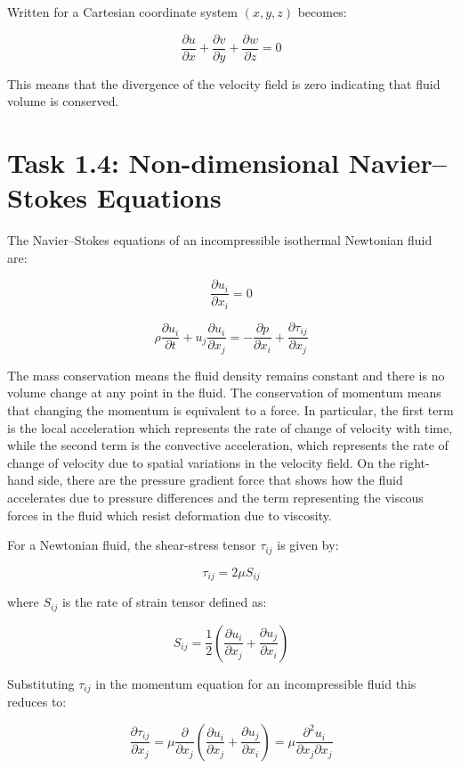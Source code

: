 \documentclass{article}
\begin{document}
Written for a Cartesian coordinate system $(x, y, z)$ becomes:

\[
\frac{\partial u}{\partial x} + \frac{\partial v}{\partial y} + \frac{\partial w}{\partial z} = 0
\]

This means that the divergence of the velocity field is zero indicating that fluid volume is conserved.

\section*{Task 1.4: Non-dimensional Navier–Stokes Equations}

The Navier–Stokes equations of an incompressible isothermal Newtonian fluid are:

\[
\frac{\partial u_i}{\partial x_i} = 0
\]

\[
\rho \frac{\partial u_i}{\partial t} + u_j \frac{\partial u_i}{\partial x_j} = - \frac{\partial p}{\partial x_i} + \frac{\partial \tau_{ij}}{\partial x_j}
\]

The mass conservation means the fluid density remains constant and there is no volume change at any point in the fluid. The conservation of momentum means that changing the momentum is equivalent to a force. In particular, the first term is the local acceleration which represents the rate of change of velocity with time, while the second term is the convective acceleration, which represents the rate of change of velocity due to spatial variations in the velocity field. On the right-hand side, there are the pressure gradient force that shows how the fluid accelerates due to pressure differences and the term representing the viscous forces in the fluid which resist deformation due to viscosity.

For a Newtonian fluid, the shear-stress tensor $\tau_{ij}$ is given by:

\[
\tau_{ij} = 2 \mu S_{ij}
\]

where $S_{ij}$ is the rate of strain tensor defined as:

\[
S_{ij} = \frac{1}{2} \left( \frac{\partial u_i}{\partial x_j} + \frac{\partial u_j}{\partial x_i} \right)
\]

Substituting $\tau_{ij}$ in the momentum equation for an incompressible fluid this reduces to:

\[
\frac{\partial \tau_{ij}}{\partial x_j} = \mu \frac{\partial}{\partial x_j} \left( \frac{\partial u_i}{\partial x_j} + \frac{\partial u_j}{\partial x_i} \right) = \mu \frac{\partial^2 u_i}{\partial x_j \partial x_j}
\]
\end{document}
